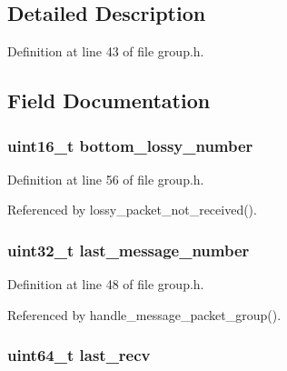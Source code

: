 \subsection{Detailed Description}


Definition at line 43 of file group.\+h.



\subsection{Field Documentation}
\hypertarget{struct_group___peer_ae3d9bdf641a1085fcb1bde6ec076b37d}{
\subsubsection[{bottom\+\_\+lossy\+\_\+number}]{\setlength{\rightskip}{0pt plus 5cm}uint16\+\_\+t bottom\+\_\+lossy\+\_\+number}}\label{struct_group___peer_ae3d9bdf641a1085fcb1bde6ec076b37d}


Definition at line 56 of file group.\+h.



Referenced by lossy\+\_\+packet\+\_\+not\+\_\+received().

\hypertarget{struct_group___peer_a1a221b969812bb7c384b0eb23fb1012d}{
\subsubsection[{last\+\_\+message\+\_\+number}]{\setlength{\rightskip}{0pt plus 5cm}uint32\+\_\+t last\+\_\+message\+\_\+number}}\label{struct_group___peer_a1a221b969812bb7c384b0eb23fb1012d}


Definition at line 48 of file group.\+h.



Referenced by handle\+\_\+message\+\_\+packet\+\_\+group().

\hypertarget{struct_group___peer_a03706feea89530a7ac78082fc79ed8fc}{
\subsubsection[{last\+\_\+recv}]{\setlength{\rightskip}{0pt plus 5cm}uint64\+\_\+t last\+\_\+recv}}\label{struct_group___peer_a03706feea89530a7ac78082fc79ed8fc}


